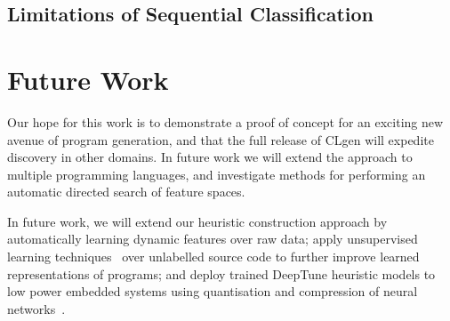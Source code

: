 


\subsection{Limitations of Sequential Classification}


\section{Future Work}

 Our hope for this work is to demonstrate a proof of concept for an exciting new avenue of program generation, and that the full release of CLgen will expedite discovery in other domains. In future work we will extend the approach to multiple programming languages, and investigate methods for performing an automatic directed search of feature spaces.

 In future work, we will extend our heuristic construction approach by automatically learning dynamic features over raw data; apply unsupervised learning techniques~\cite{Le2012} over unlabelled source code to further improve learned representations of programs; and deploy trained DeepTune heuristic models to low power embedded systems using quantisation and compression of neural networks~\cite{Han2015}.


